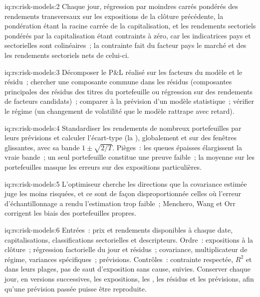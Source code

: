 \begin{solution}{iq:rs:risk-models:2}
Chaque jour, régression par moindres carrés pondérés des rendements transversaux sur les expositions de la clôture précédente, la pondération étant la racine carrée de la capitalisation, et
les rendements sectoriels pondérés par la capitalisation étant contraints à zéro, car les indicatrices pays et sectorielles sont colinéaires~; la contrainte fait du facteur pays le marché et
des  les rendements sectoriels nets de celui-ci.
\end{solution}

\begin{solution}{iq:rs:risk-models:3}
Décomposer le P\&L réalisé sur les facteurs du modèle et le résidu~; chercher une composante commune dans les résidus (composantes principales des résidus des titres du portefeuille
ou régression sur des rendements de facteurs candidats)~; comparer à la prévision d'un modèle statistique~; vérifier le régime (un changement de volatilité que le modèle rattrape avec retard).
\end{solution}

\begin{solution}{iq:rs:risk-models:4}
Standardiser les rendements de nombreux portefeuilles par leurs prévisions et calculer l'écart-type (la ), globalement et sur des fenêtres glissantes, avec sa bande
$1 \pm \sqrt{2/T}$. Pièges~: les queues épaisses élargissent la vraie bande~; un seul portefeuille constitue une preuve faible~; la moyenne sur les portefeuilles masque les erreurs sur des expositions particulières.
\end{solution}

\begin{solution}{iq:rs:risk-models:5}
L'optimiseur cherche les directions que la covariance estimée juge les moins risquées, et ce sont de façon disproportionnée celles où l'erreur d'échantillonnage a rendu l'estimation trop
faible~; Menchero, Wang et Orr corrigent les biais des portefeuilles propres.
\end{solution}

\begin{solution}{iq:rs:risk-models:6}
Entrées~: prix et rendements disponibles à chaque date, capitalisations, classifications sectorielles et descripteurs. Ordre~: expositions à la clôture~; régression factorielle du jour et
résidus~; covariance, multiplicateur de régime, variances spécifiques~; prévisions. Contrôles~: contrainte respectée, $R^2$ et  dans leurs plages, pas de saut d'exposition
sans cause,  suivies. Conserver chaque jour, en versions successives, les expositions, les , les résidus et les prévisions, afin qu'une prévision passée puisse être reproduite.
\end{solution}

